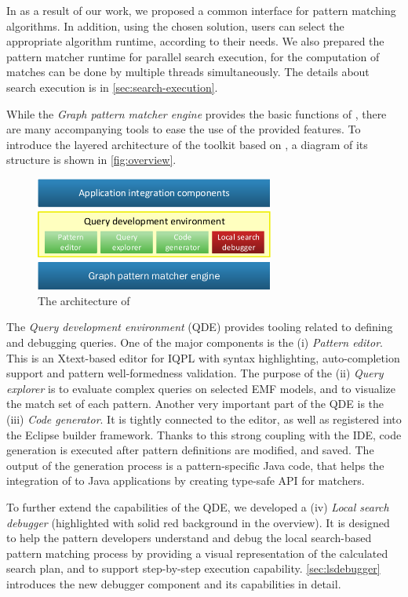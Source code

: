 In as a result of our work, we proposed a common interface for pattern matching algorithms. In addition, using the chosen solution, users can select the appropriate algorithm runtime, according to their needs. We also prepared the pattern matcher runtime for parallel search execution, for the computation of matches can be done by multiple threads simultaneously. The details about search execution is in \autoref{sec:search-execution}.

While the \emph{Graph pattern matcher engine} provides the basic functions of \eiq, there are many accompanying tools to ease the use of the provided features. To introduce the layered architecture of the toolkit based on \cite{DBLP:journals/scp/UjhelyiBHHIRSV15}, a diagram of its structure is shown in \autoref{fig:overview}. 

\begin{figure}[!htp]
	\centering
	\includegraphics[width=0.7\textwidth]{figures/pdfs/overview}
	\caption{The architecture of \eiq}
	\label{fig:overview}
\end{figure}

The \emph{Query development environment} (QDE) provides tooling related to defining and debugging queries. One of the major components is the (i) \emph{Pattern editor}. This is an Xtext-based \cite{Xtext} editor for IQPL with syntax highlighting, auto-completion support and pattern well-formedness validation. The purpose of the (ii) \emph{Query explorer} is to evaluate complex queries on selected EMF models, and to visualize the match set of each pattern. Another very important part of the QDE is the (iii) \emph{Code generator}. It is tightly connected to the editor, as well as registered into the Eclipse builder framework. Thanks to this strong coupling with the IDE, code generation is executed after pattern definitions are modified, and saved. The output of the generation process is a pattern-specific Java code, that helps the integration of \eiq to Java applications by creating type-safe API for matchers. 

To further extend the capabilities of the QDE, we developed a (iv) \emph{Local search debugger} (highlighted with solid red background in the overview). It is designed to help the pattern developers understand and debug the local search-based pattern matching process by providing a visual representation of the calculated search plan, and to support step-by-step execution capability. \autoref{sec:lsdebugger} introduces the new debugger component and its capabilities in detail.


